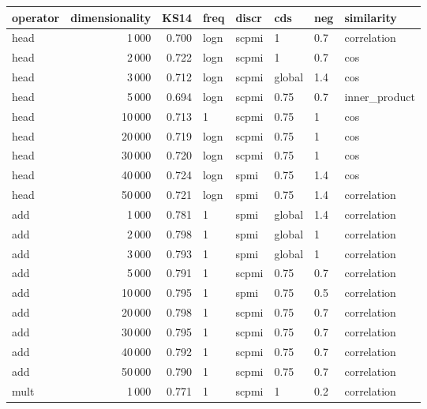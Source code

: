 \begin{tabular}{lrrlllll}
\toprule
operator &  dimensionality &   KS14 &  freq &  discr &     cds &  neg &     similarity \\
\midrule
    head &            1\,000 &  0.700 &  logn &  scpmi &       1 &  0.7 &    correlation \\
    head &            2\,000 &  0.722 &  logn &  scpmi &       1 &  0.7 &            cos \\
    head &            3\,000 &  0.712 &  logn &  scpmi &  global &  1.4 &            cos \\
    head &            5\,000 &  0.694 &  logn &  scpmi &    0.75 &  0.7 &  inner\_product \\
    head &           10\,000 &  0.713 &     1 &  scpmi &    0.75 &    1 &            cos \\
    head &           20\,000 &  0.719 &  logn &  scpmi &    0.75 &    1 &            cos \\
    head &           30\,000 &  0.720 &  logn &  scpmi &    0.75 &    1 &            cos \\
    head &           40\,000 &  0.724 &  logn &   spmi &    0.75 &  1.4 &            cos \\
    head &           50\,000 &  0.721 &  logn &   spmi &    0.75 &  1.4 &    correlation \\
     add &            1\,000 &  0.781 &     1 &   spmi &  global &  1.4 &    correlation \\
     add &            2\,000 &  0.798 &     1 &   spmi &  global &    1 &    correlation \\
     add &            3\,000 &  0.793 &     1 &   spmi &  global &    1 &    correlation \\
     add &            5\,000 &  0.791 &     1 &  scpmi &    0.75 &  0.7 &    correlation \\
     add &           10\,000 &  0.795 &     1 &   spmi &    0.75 &  0.5 &    correlation \\
     add &           20\,000 &  0.798 &     1 &  scpmi &    0.75 &  0.7 &    correlation \\
     add &           30\,000 &  0.795 &     1 &  scpmi &    0.75 &  0.7 &    correlation \\
     add &           40\,000 &  0.792 &     1 &  scpmi &    0.75 &  0.7 &    correlation \\
     add &           50\,000 &  0.790 &     1 &  scpmi &    0.75 &  0.7 &    correlation \\
    mult &            1\,000 &  0.771 &     1 &  scpmi &       1 &  0.2 &    correlation \\

\end{tabular}
